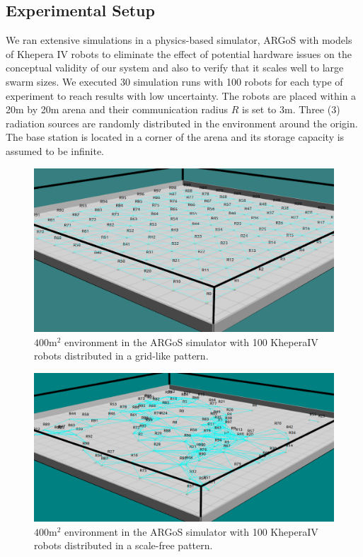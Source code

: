 \subsection{Experimental Setup}
We ran extensive simulations in a physics-based simulator, ARGoS
\cite{Pinciroli:SI2012} with models of Khepera IV
\cite{kteam2021kheperaiv} robots to eliminate the effect of potential
hardware issues on the conceptual validity of our system and also to
verify that it scales well to large swarm sizes. We executed 30 simulation
runs with 100 robots for each type of experiment to reach results
with low uncertainty. The robots are placed within a 20m by 20m arena and their communication radius $R$ is set to 3m. Three (3) radiation sources are randomly distributed in the environment around the origin. The base station is located in a corner of the arena and its storage capacity is assumed to be infinite. 

\begin{figure}[htbp]
	\centering
    \includegraphics[width=\columnwidth]{figures/dora_mesh/argos_grid_link.png}
    \caption[Grid formation in ARGoS]{$400 \text{m}^2$ environment in the ARGoS simulator with 100 KheperaIV robots distributed in a grid-like pattern.}
    \label{argos:grid}
\end{figure}

\begin{figure}[htbp]
	\centering
    \includegraphics[width=\columnwidth]{figures/dora_mesh/argos_scale_free.png}
    \caption[Scale-free formation in ARGoS]{$400 \text{m}^2$ environment in the ARGoS simulator with 100 KheperaIV robots distributed in a scale-free pattern.}
    \label{argos:scale-free}
\end{figure}

